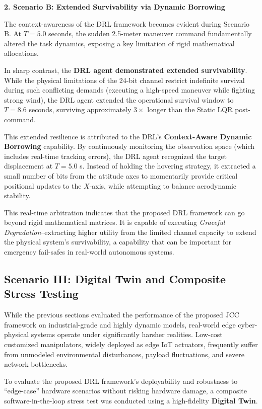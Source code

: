 \noindent\textbf{2. Scenario B: Extended Survivability via Dynamic Borrowing}

The context-awareness of the DRL framework becomes evident during Scenario B. At $T = 5.0$ seconds, 
the sudden 2.5-meter maneuver command fundamentally altered the task dynamics, exposing a key limitation of rigid mathematical allocations.

In sharp contrast, the \textbf{DRL agent demonstrated extended survivability}. While the physical limitations of the 24-bit channel restrict indefinite survival during such conflicting demands (executing a high-speed maneuver while fighting strong wind),
the DRL agent extended the operational survival window to $T=8.6$ seconds, surviving approximately $3\times$ longer than the Static LQR post-command.

This extended resilience is attributed to the DRL's \textbf{Context-Aware Dynamic Borrowing} capability. By continuously monitoring the observation 
space (which includes real-time tracking errors), the DRL agent recognized the target displacement at $T = 5.0$ s. 
Instead of holding the hovering strategy, it extracted a small number of bits from the attitude axes to momentarily provide critical positional updates to the $X$-axis, while attempting to balance aerodynamic stability.

This real-time arbitration indicates that the proposed DRL framework can go beyond rigid mathematical matrices. It is capable of 
executing \textit{Graceful Degradation}--extracting higher utility from the limited channel capacity to extend the physical system's survivability,
a capability that can be important for emergency fail-safes in real-world autonomous systems.
\subsection{Scenario III: Digital Twin and Composite Stress Testing}\label{sec:dtc}
While the previous sections evaluated the performance of the proposed JCC framework on industrial-grade 
and highly dynamic models, real-world edge cyber-physical systems operate under significantly harsher realities. Low-cost customized 
manipulators, widely deployed as edge IoT actuators, frequently suffer from unmodeled environmental disturbances, payload fluctuations,
and severe network bottlenecks.

To evaluate the proposed DRL framework's deployability and robustness to ``edge-case'' hardware scenarios without risking hardware damage, a composite software-in-the-loop stress test was conducted using a high-fidelity \textbf{Digital Twin}.

